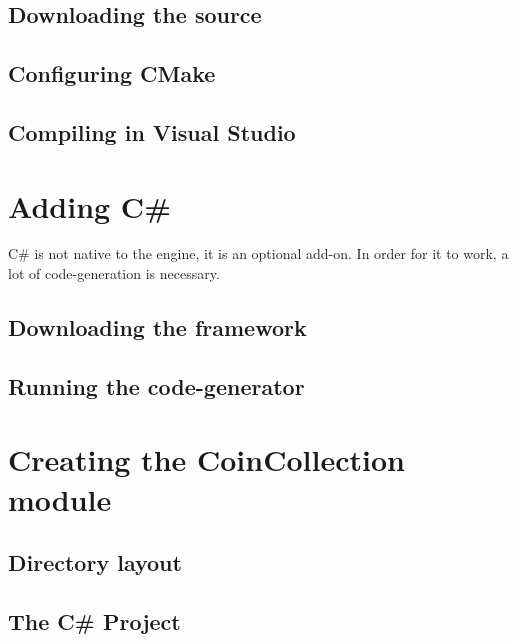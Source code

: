 \subsection{Downloading the source}
\blindtext

\subsection{Configuring CMake}
\blindtext

\subsection{Compiling in Visual Studio}
\blindtext

\section{Adding C\#}
C\# is not native to the engine, it is an optional add-on. In order for it to work, a lot of code-generation is necessary.

\blindtext

\subsection{Downloading the framework}
\blindtext

\subsection{Running the code-generator}
\blindtext


\section{Creating the CoinCollection module}

\subsection{Directory layout}
\blindtext

\subsection{The C\# Project}
\blindtext


